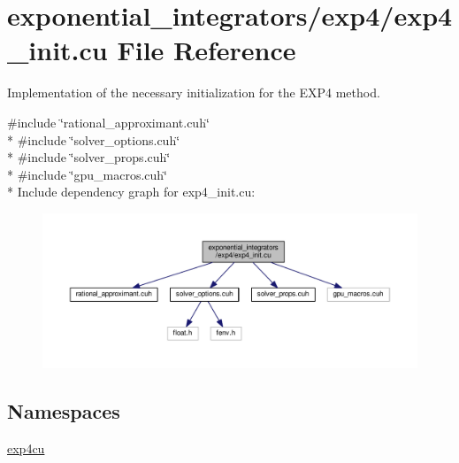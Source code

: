\hypertarget{exp4__init_8cu}{}\section{exponential\+\_\+integrators/exp4/exp4\+\_\+init.cu File Reference}
\label{exp4__init_8cu}


Implementation of the necessary initialization for the E\+X\+P4 method.  


{\ttfamily \#include \char`\"{}rational\+\_\+approximant.\+cuh\char`\"{}}\\*
{\ttfamily \#include \char`\"{}solver\+\_\+options.\+cuh\char`\"{}}\\*
{\ttfamily \#include \char`\"{}solver\+\_\+props.\+cuh\char`\"{}}\\*
{\ttfamily \#include \char`\"{}gpu\+\_\+macros.\+cuh\char`\"{}}\\*
Include dependency graph for exp4\+\_\+init.\+cu\+:\nopagebreak
\begin{figure}[H]
\begin{center}
\leavevmode
\includegraphics[width=350pt]{exp4__init_8cu__incl}
\end{center}
\end{figure}
\subsection*{Namespaces}
\begin{DoxyCompactItemize}
\item 
 \hyperlink{namespaceexp4cu}{exp4cu}
\end{DoxyCompactItemize}
